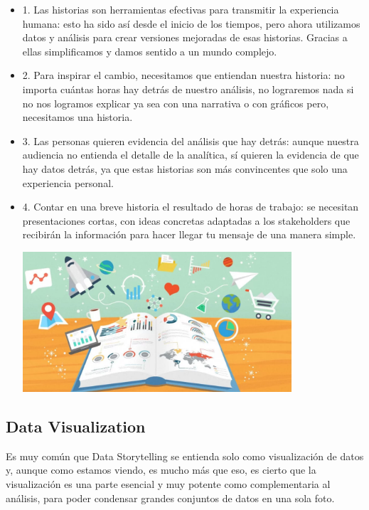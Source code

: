 \documentclass[preprint,12pt]{elsarticle}
\begin{document}
\begin{itemize}
\item	1.	Las historias son herramientas efectivas para transmitir la experiencia humana: esto ha sido así desde el inicio de los tiempos, pero ahora utilizamos datos y análisis para crear versiones mejoradas de esas historias. Gracias a ellas simplificamos y damos sentido a un mundo complejo.
\item 2.	Para inspirar el cambio, necesitamos que entiendan nuestra historia: no importa cuántas horas hay detrás de nuestro análisis, no lograremos nada si no nos logramos explicar ya sea con una narrativa o con gráficos pero, necesitamos una historia.
\item 3.	Las personas quieren evidencia del análisis que hay detrás: aunque nuestra audiencia no entienda el detalle de la analítica, sí quieren la evidencia de que hay datos detrás, ya que estas historias son más convincentes que solo una experiencia personal.
\item	4.	Contar en una breve historia el resultado de horas de trabajo: se necesitan presentaciones cortas, con ideas concretas adaptadas a los stakeholders que recibirán la información para hacer llegar tu mensaje de una manera simple. \\
	\begin{center}
	\includegraphics[width=10cm]{./Imagenes/imagen3} 
	\end{center}
\end{itemize} 


\subsection{Data Visualization}
	Es muy común que Data Storytelling se entienda solo como visualización de datos y, aunque como estamos viendo, es mucho más que eso, es cierto que la visualización es una parte esencial y muy potente como complementaria al análisis, para poder condensar grandes conjuntos de datos en una sola foto.
\end{document}
